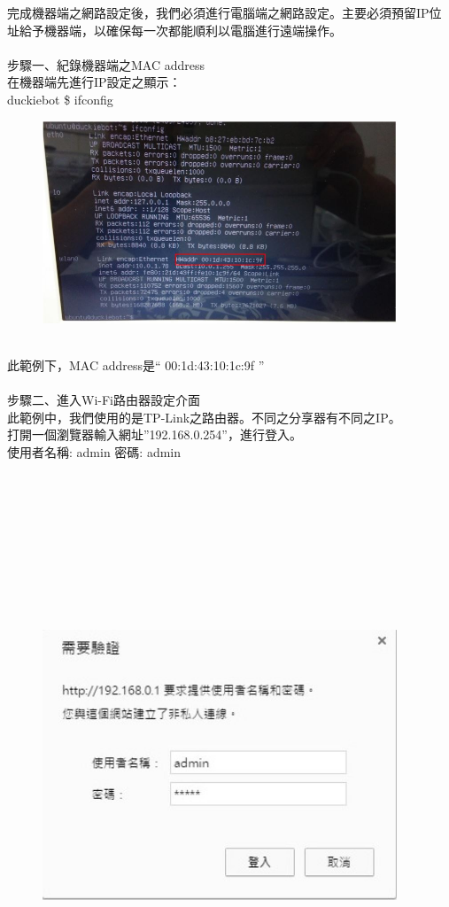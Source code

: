 \documentclass{article}
\begin{document}
完成機器端之網路設定後，我們必須進行電腦端之網路設定。主要必須預留IP位址給予機器端，以確保每一次都能順利以電腦進行遠端操作。
\\
\\步驟一、紀錄機器端之MAC address
\\在機器端先進行IP設定之顯示：
\\duckiebot \$ ifconfig
\begin{figure}[htp]
    \begin{center}
        \includegraphics[width=300pt]{pic/圖片13.jpg}
    \end{center}
\end{figure}
\\此範例下，MAC address是“ 00:1d:43:10:1c:9f ”
\\
\\步驟二、進入Wi-Fi路由器設定介面
\\此範例中，我們使用的是TP-Link之路由器。不同之分享器有不同之IP。
\\打開一個瀏覽器輸入網址”192.168.0.254”，進行登入。
\\使用者名稱: admin   密碼: admin
\\\\\\\\\\\\\\\\\\\\
\begin{figure}[htp]
    \begin{center}
        \includegraphics[width=300pt]{pic/圖片14.jpg}
    \end{center}
\end{figure}
\end{document}
